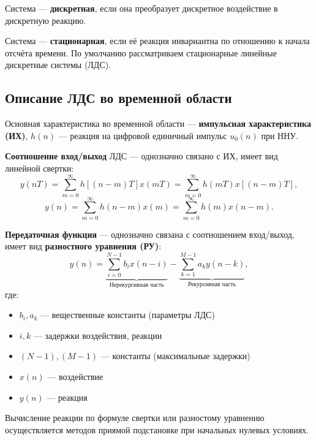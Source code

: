 \documentclass[a4paper, 14pt]{extarticle}
\begin{document}
Система --- \textbf{дискретная}, если она преобразует дискретное воздействие в дискретную реакцию.

Система --- \textbf{стационарная}, если её реакция инвариантна по отношению к начала отсчёта времени. По умолчанию рассматриваем стационарные линейные дискретные системы (ЛДС).


\subsection{Описание ЛДС во временной области}
Основная характеристика во временной области --- \textbf{импульсная характеристика (ИХ)}, $h(n)$ --- реакция на цифровой единичный импульс $u_0(n)$ при ННУ.

\textbf{Соотношение вход/выход} ЛДС --- однозначно связано с ИХ, имеет вид линейной свертки:
\begin{equation}
    y(nT) = \sum^{\infty}_{m=0} h[ (n - m)T ] x(mT) = \sum^{\infty}_{m=0} h(mT) x [ (n-m)T ],
\end{equation}
\begin{equation}
    y(n) = \sum^{\infty}_{m=0} h(n-m)x(m) = \sum^{\infty}_{m=0} h(m) x(n-m).
\end{equation}

\textbf{Передаточная функция} --- однозначно связана с соотношением вход/выход, имеет вид \textbf{разностного уравнения (РУ)}:
\begin{equation}
    y(n) = \underbrace{\sum^{N-1}_{i=0} b_i x(n-i)}_\text{Нерекурсивная часть} - \underbrace{\sum^{M-1}_{k=1} a_k y(n-k)}_\text{Рекурсивная часть}, 
\end{equation}
где:
\begin{itemize}
    \item $b_i, a_k$ --- вещественные константы (параметры ЛДС)
    \item $i, k$ --- задержки воздействия, реакции
    \item $(N-1), (M-1)$ --- константы (максимальные задержки)
    \item $x(n)$ --- воздействие
    \item $y(n)$ --- реакция
\end{itemize}

Вычисление реакции по формуле свертки или разностому уравнению осуществляется методов приямой подстановке при начальных нулевых условиях.
\end{document}
